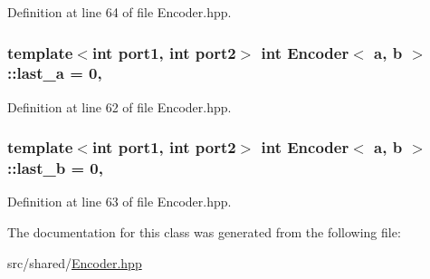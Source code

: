 Definition at line 64 of file Encoder.\-hpp.

\hypertarget{classEncoder_af68226c82a0ec90d00cc40d733ca9eab}{
\subsubsection[{last\-\_\-a}]{\setlength{\rightskip}{0pt plus 5cm}template$<$int port1, int port2$>$ int {\bf Encoder}$<$ a, b $>$\-::last\-\_\-a = 0\hspace{0.3cm}{\ttfamily [static]}, {\ttfamily [private]}}}\label{classEncoder_af68226c82a0ec90d00cc40d733ca9eab}


Definition at line 62 of file Encoder.\-hpp.

\hypertarget{classEncoder_a5a4bc2fcd23a97e69a47ecf3cd6e0914}{
\subsubsection[{last\-\_\-b}]{\setlength{\rightskip}{0pt plus 5cm}template$<$int port1, int port2$>$ int {\bf Encoder}$<$ a, b $>$\-::last\-\_\-b = 0\hspace{0.3cm}{\ttfamily [static]}, {\ttfamily [private]}}}\label{classEncoder_a5a4bc2fcd23a97e69a47ecf3cd6e0914}


Definition at line 63 of file Encoder.\-hpp.



The documentation for this class was generated from the following file\-:\begin{DoxyCompactItemize}
\item 
src/shared/\hyperlink{Encoder_8hpp}{Encoder.\-hpp}\end{DoxyCompactItemize}
